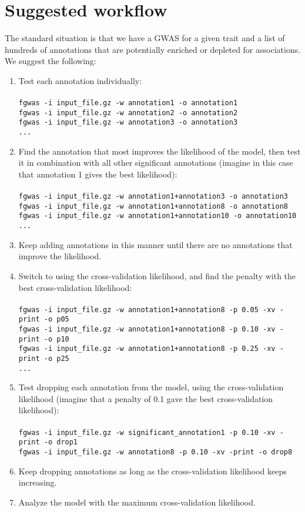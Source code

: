 \documentclass[11pt,titlepage]{article}
\begin{document}
\section{Suggested workflow}
The standard situation is that we have a GWAS for a given trait and a list of hundreds of annotations that are potentially enriched or depleted for associations. We suggest the following:
\begin{enumerate}
\item Test each annotation individually:
\\
\\
\texttt{fgwas -i input\_file.gz -w annotation1 -o annotation1}\\
\texttt{fgwas -i input\_file.gz -w annotation2 -o annotation2}\\
\texttt{fgwas -i input\_file.gz -w annotation3 -o annotation3}\\
\texttt{...}
\item Find the annotation that most improves the likelihood of the model, then test it in combination with all other significant annotations (imagine in this case that annotation 1 gives the best likelihood):
\\
\\
\texttt{fgwas -i input\_file.gz -w annotation1+annotation3 -o annotation3}\\
\texttt{fgwas -i input\_file.gz -w annotation1+annotation8 -o annotation8}\\
\texttt{fgwas -i input\_file.gz -w annotation1+annotation10 -o annotation10}\\
\texttt{...}
\item Keep adding annotations in this manner until there are no annotations that improve the likelihood.
\item Switch to using the cross-validation likelihood, and find the penalty with the best cross-validation likelihood:
\\
\\
\texttt{fgwas -i input\_file.gz -w annotation1+annotation8 -p 0.05 -xv -print -o p05}\\
\texttt{fgwas -i input\_file.gz -w annotation1+annotation8 -p 0.10 -xv -print -o p10}\\
\texttt{fgwas -i input\_file.gz -w annotation1+annotation8 -p 0.25 -xv -print -o p25}\\
\texttt{...}
\item Test dropping each annotation from the model, using the cross-validation likelihood (imagine that a penalty of 0.1 gave the best cross-validation likelihood):
\\
\\
\texttt{fgwas -i input\_file.gz -w significant\_annotation1 -p 0.10 -xv -print -o drop1}\\
\texttt{fgwas -i input\_file.gz -w annotation8 -p 0.10 -xv -print -o drop8}\\
\item Keep dropping annotations as long as the cross-validation likelihood keeps increasing.
\item Analyze the model with the maximum cross-validation likelihood.
\end{enumerate}
\clearpage


\end{document}
